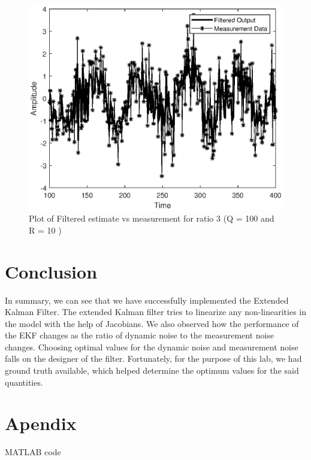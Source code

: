 \documentclass{article}
\begin{document}
\begin{figure}
\centering
\includegraphics[scale=0.60]{ratio3_filt_vs_measure.eps}
\caption{Plot of Filtered estimate vs measurement for ratio 3 (Q = 100 and R = 10 )}
\label{fig:sixth}
\end{figure}



\pagebreak
\clearpage
\section{Conclusion}\label{sec:conc}

In summary, we can see that we have successfully implemented the Extended Kalman Filter. The extended Kalman filter tries to linearize any non-linearities in the model with the help of Jacobians. We also observed how the performance of the EKF changes as the ratio of dynamic noise to the measurement noise changes. Choosing optimal values for the dynamic noise and measurement noise falls on the designer of the filter. Fortunately, for the purpose of this lab, we had ground truth available, which helped determine the optimum values for the said quantities.

\section{Apendix}\label{sec:apdx}
 MATLAB code
\end{document}
